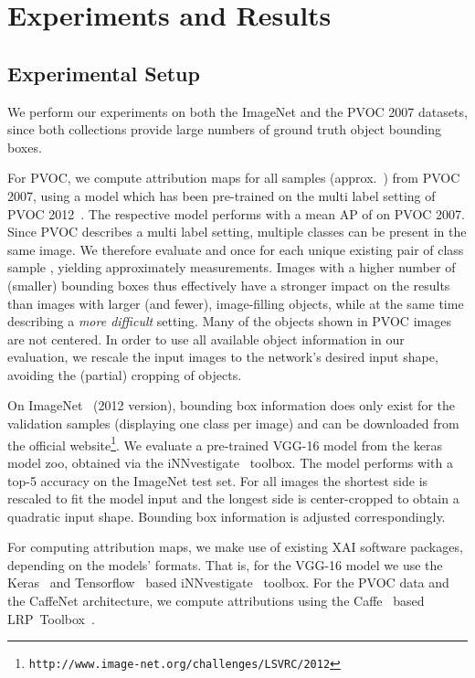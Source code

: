 \documentclass[conference]{IEEEtran}
\begin{document}
\section{Experiments and Results}

\subsection{Experimental Setup}
\label{sec:setup}


We perform our experiments on both the ImageNet and the PVOC 2007 datasets,
since both collections provide large numbers of ground truth object bounding boxes.

For PVOC, we compute attribution maps for all samples (approx.~) from PVOC 2007, using a model which has been pre-trained on the multi label setting of PVOC 2012~\cite{pascal-voc-2012,lapuschkin2016analyzing}.
The respective model performs with a mean AP of  on PVOC 2007.
Since PVOC describes a multi label setting, multiple classes can be present in the same image.
We therefore evaluate  and  once for each unique existing pair of  class  sample ,
yielding approximately  measurements.
Images with a higher number of (smaller) bounding boxes thus effectively have a stronger impact on the results than images with larger (and fewer), image-filling objects, while at the same time describing a \emph{more difficult} setting.
Many of the objects shown in PVOC images are not centered.
In order to use all available object information in our evaluation, we rescale the input images to the network's desired input shape, avoiding the (partial) cropping of objects.

On ImageNet~\cite{ILSVRC15} (2012 version), bounding box information does only exist for the  validation samples (displaying one class per image) and can be downloaded from the official website\footnote{\texttt{http://www.image-net.org/challenges/LSVRC/2012}}.
We evaluate a pre-trained VGG-16 model from the keras model zoo,
obtained via the iNNvestigate~\cite{alber2019innvestigate} toolbox.
The model performs with a  top-5 accuracy on the ImageNet test set.
For all images the shortest side is rescaled to fit the model input and the longest side is center-cropped to obtain a quadratic input shape.
Bounding box information is adjusted correspondingly.

For computing attribution maps, we make use of existing XAI software packages, depending on the models' formats.
That is, for the VGG-16 model we use the Keras~\cite{chollet2015keras} and Tensorflow~\cite{abadi2015tensorflow} based iNNvestigate~\cite{alber2019innvestigate} toolbox.
For the PVOC data and the CaffeNet architecture, we compute attributions using the Caffe~\cite{jia2014caffe} based LRP~Toolbox~\cite{lapuschkin2016lrp}.
\end{document}
